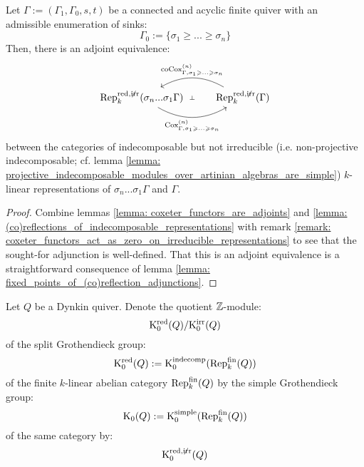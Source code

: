             \begin{theorem} \label{theorem: coxeter_functors_preserve_non_projective_indecomposable_representations}
                Let $\Gamma := (\Gamma_1, \Gamma_0, s, t)$ be a connected and acyclic finite quiver with an admissible enumeration of sinks:
                    $$\Gamma_0 := \{\sigma_1 \geq ... \geq \sigma_n\}$$
                Then, there is an adjoint equivalence:
                    $$
                        \begin{tikzcd}
                        	{\Rep_k^{\red, \not \irr}(\sigma_n ... \sigma_1\Gamma)} & {\Rep_k^{\red, \not \irr}(\Gamma)}
                        	\arrow[""{name=0, anchor=center, inner sep=0}, "{\Cox_{\Gamma, \sigma_1 \geq ...\geq \sigma_n}^{(n)}}"', bend right, from=1-1, to=1-2]
                        	\arrow[""{name=1, anchor=center, inner sep=0}, "{\co\Cox_{\Gamma, \sigma_1 \geq ...\geq \sigma_n}^{(n)}}"', bend right, from=1-2, to=1-1]
                        	\arrow["\dashv"{anchor=center, rotate=-90}, draw=none, from=1, to=0]
                        \end{tikzcd}
                    $$
                between the categories of indecomposable but not irreducible (i.e. non-projective indecomposable; cf. lemma \ref{lemma: projective_indecomposable_modules_over_artinian_algebras_are_simple}) $k$-linear representations of $\sigma_n ... \sigma_1 \Gamma$ and $\Gamma$. 
            \end{theorem}
                \begin{proof}
                    Combine lemmas \ref{lemma: coxeter_functors_are_adjoints} and \ref{lemma: (co)reflections_of_indecomposable_representations} with remark \ref{remark: coxeter_functors_act_as_zero_on_irreducible_representations} to see that the sought-for adjunction is well-defined. That this is an adjoint equivalence is a straightforward consequence of lemma \ref{lemma: fixed_points_of_(co)reflection_adjunctions}.
                \end{proof}
            \begin{convention}
                Let $Q$ be a Dynkin quiver. Denote the quotient $\mathbb{Z}$-module:
                    $$\mathrm{K}_0^{\mathrm{red}}(Q)/\mathrm{K}_0^{\mathrm{irr}}(Q)$$
                of the split Grothendieck group:
                    $$\mathrm{K}_0^{\mathrm{red}}(Q) := \mathrm{K}_0^{\mathrm{indecomp}}(\mathrm{Rep}_k^{\mathrm{fin}}(Q))$$
                of the finite $k$-linear abelian category $\mathrm{Rep}_k^{\mathrm{fin}}(Q)$ by the simple Grothendieck group:
                    $$\mathrm{K}_0(Q) := \mathrm{K}_0^{\mathrm{simple}}(\mathrm{Rep}_k^{\mathrm{fin}}(Q))$$
                of the same category by:
                    $$\mathrm{K}_0^{\mathrm{red}, \not \mathrm{irr}}(Q)$$
            \end{convention}
